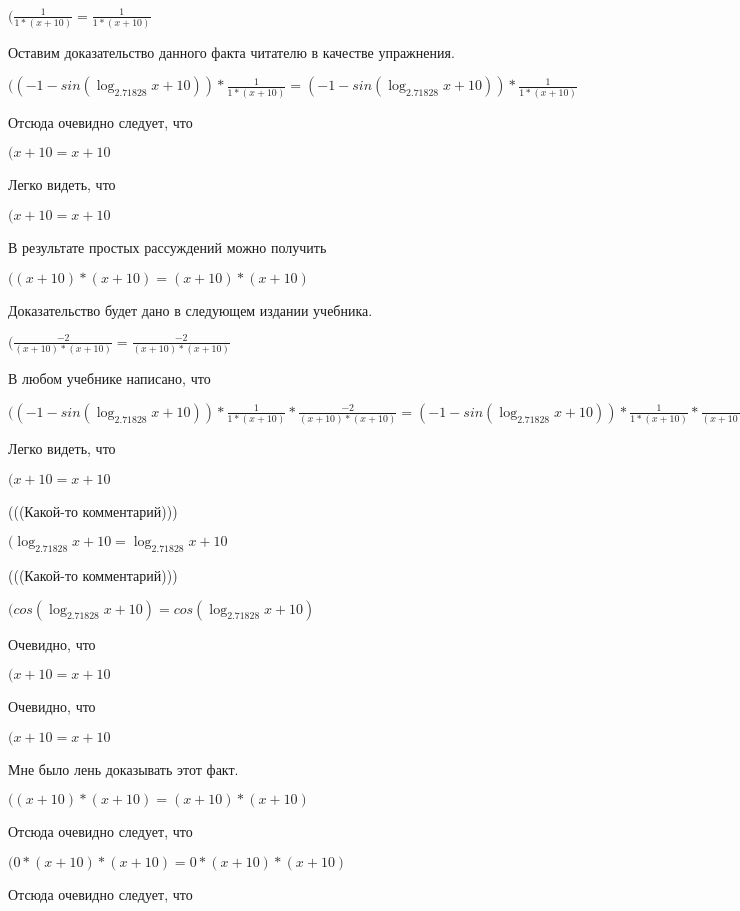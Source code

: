 \documentclass[12pt,a4paper,fleqn]{article}
\theoremstyle{definition}
\begin{document}
$(\frac{ 1 }{ 1  * ( x  +  10 )}
 = \frac{ 1 }{ 1  * ( x  +  10 )}
$

Оставим доказательство данного факта читателю в качестве упражнения.

$(( -1  - sin(\log_{ 2.71828 }{ x  +  10 })) * \frac{ 1 }{ 1  * ( x  +  10 )}
 = ( -1  - sin(\log_{ 2.71828 }{ x  +  10 })) * \frac{ 1 }{ 1  * ( x  +  10 )}
$

Отсюда очевидно следует, что

$( x  +  10  =  x  +  10 $

Легко видеть, что

$( x  +  10  =  x  +  10 $

В результате простых рассуждений можно получить

$(( x  +  10 ) * ( x  +  10 ) = ( x  +  10 ) * ( x  +  10 )$

Доказательство будет дано в следующем издании учебника.

$(\frac{ -2 }{( x  +  10 ) * ( x  +  10 )}
 = \frac{ -2 }{( x  +  10 ) * ( x  +  10 )}
$

В любом учебнике написано, что

$(( -1  - sin(\log_{ 2.71828 }{ x  +  10 })) * \frac{ 1 }{ 1  * ( x  +  10 )}
 * \frac{ -2 }{( x  +  10 ) * ( x  +  10 )}
 = ( -1  - sin(\log_{ 2.71828 }{ x  +  10 })) * \frac{ 1 }{ 1  * ( x  +  10 )}
 * \frac{ -2 }{( x  +  10 ) * ( x  +  10 )}
$

Легко видеть, что

$( x  +  10  =  x  +  10 $

(((Какой-то комментарий)))

$(\log_{ 2.71828 }{ x  +  10 } = \log_{ 2.71828 }{ x  +  10 }$

(((Какой-то комментарий)))

$(cos(\log_{ 2.71828 }{ x  +  10 }) = cos(\log_{ 2.71828 }{ x  +  10 })$

Очевидно, что

$( x  +  10  =  x  +  10 $

Очевидно, что

$( x  +  10  =  x  +  10 $

Мне было лень доказывать этот факт.

$(( x  +  10 ) * ( x  +  10 ) = ( x  +  10 ) * ( x  +  10 )$

Отсюда очевидно следует, что

$( 0  * ( x  +  10 ) * ( x  +  10 ) =  0  * ( x  +  10 ) * ( x  +  10 )$

Отсюда очевидно следует, что
\end{document}
